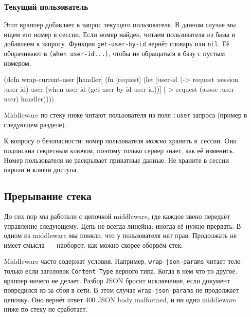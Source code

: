 \subsubsection*{Текущий пользователь}


Этот враппер добавляет в запрос текущего пользователя. В данном случае мы ищем
его номер в сессии. Если номер найден, читаем пользователя из базы и добавляем к
запросу. Функция \verb|get-user-by-id| вернёт словарь или
\verb|nil|. Её оборачивают в \verb|(when user-id...)|, чтобы не
обращаться в базу с пустым номером.


\begin{english}
  \begin{clojure}
(defn wrap-current-user [handler]
  (fn [request]
    (let [user-id (-> request :session :user-id)
          user (when user-id
                 (get-user-by-id user-id))]
      (-> request
          (assoc :user user)
          handler))))
  \end{clojure}
\end{english}


Middleware по стеку ниже читают пользователя из поля \verb|:user| запроса
(пример в следующем разделе).

К вопросу о безопасности: номер пользователя \emph{можно} хранить в~сессии. Она
подписана секретным ключом, поэтому только сервер знает, как её
изменить. Номер пользователя не раскрывает приватные данные. Не храните в сессии
пароли и ключи доступа.

\subsection{Прерывание стека}


До сих пор мы работали с цепочкой middleware, где каждое звено передаёт
управление следующему. Цепь не всегда линейна: иногда её нужно прервать. В
одном из middleware мы поняли, что у пользователя нет прав. Продолжать не имеет
смысла~--- наоборот, как можно скорее оборвём стек.


Middleware часто содержат условия. Например, \verb|wrap-json-params| читает тело
только если заголовок \verb|Content-Type| верного типа. Когда в нём что-то
другое, враппер ничего не делает. Разбор JSON бросит исключение, если документ
повредился из-за сбоя в сети. В этом случае \verb|wrap-json-params| не
продолжает цепочку. Оно вернёт ответ 400 JSON body malformed, и ни одно
middleware ниже по стеку не сработает.

